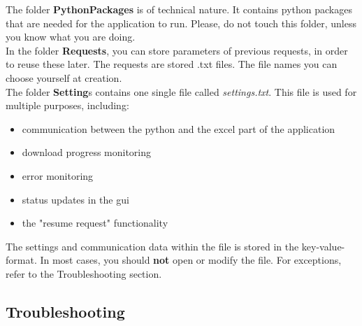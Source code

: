 The folder \textbf{PythonPackages} is of technical nature. It contains python packages that are needed for the application to run. Please, do not touch this folder, unless you know what you are doing. \\

In the folder \textbf{Requests}, you can store parameters of previous requests, in order to reuse these later. The requests are stored .txt files. The file names you can choose yourself at creation. \\

The folder \textbf{Setting}s contains one single file called \textit{settings.txt}. This file is used for multiple purposes, including: 

\begin{itemize}
	\item communication between the python and the excel part of the application
	\item download progress monitoring
	\item error monitoring
	\item status updates in the gui
	\item the "resume request" functionality
\end{itemize}
The settings and communication data within the file is stored in the key-value-format. In most cases, you should \textbf{not} open or modify the file. For exceptions, refer to the Troubleshooting section. 

\subsection{Troubleshooting}

